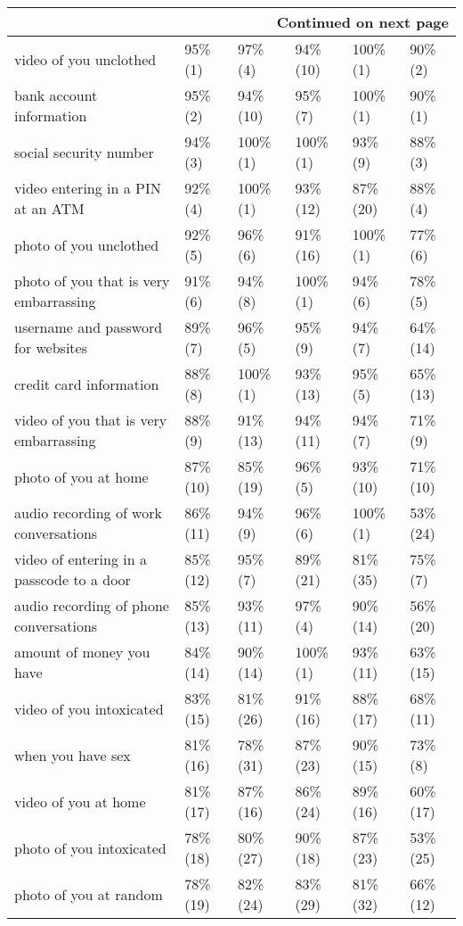 \documentclass[a4paper,12pt]{article}
\begin{document}
\begin{longtable}{| p{7cm} | l | l | l | l | l |}
\hline \multicolumn{6}{|r|}{{Continued on next page}} \\ \hline
\endfoot
\hline 
\endlastfoot
video of you unclothed & 95\% (1) & 97\% (4) & 94\% (10) & 100\% (1) & 90\% (2) \\ 
bank account information & 95\% (2) & 94\% (10) & 95\% (7) & 100\% (1) & 90\% (1) \\ 
social security number & 94\% (3) & 100\% (1) & 100\% (1) & 93\% (9) & 88\% (3) \\ 
video entering in a PIN at an ATM & 92\% (4) & 100\% (1) & 93\% (12) & 87\% (20) & 88\% (4) \\ 
photo of you unclothed & 92\% (5) & 96\% (6) & 91\% (16) & 100\% (1) & 77\% (6) \\ 
photo of you that is very embarrassing & 91\% (6) & 94\% (8) & 100\% (1) & 94\% (6) & 78\% (5) \\ 
username and password for websites & 89\% (7) & 96\% (5) & 95\% (9) & 94\% (7) & 64\% (14) \\ 
credit card information & 88\% (8) & 100\% (1) & 93\% (13) & 95\% (5) & 65\% (13) \\ 
video of you that is very embarrassing & 88\% (9) & 91\% (13) & 94\% (11) & 94\% (7) & 71\% (9) \\ 
photo of you at home & 87\% (10) & 85\% (19) & 96\% (5) & 93\% (10) & 71\% (10) \\ 
audio recording of work conversations & 86\% (11) & 94\% (9) & 96\% (6) & 100\% (1) & 53\% (24) \\ 
video of entering in a passcode to a door & 85\% (12) & 95\% (7) & 89\% (21) & 81\% (35) & 75\% (7) \\ 
audio recording of phone conversations & 85\% (13) & 93\% (11) & 97\% (4) & 90\% (14) & 56\% (20) \\ 
amount of money you have & 84\% (14) & 90\% (14) & 100\% (1) & 93\% (11) & 63\% (15) \\ 
video of you intoxicated & 83\% (15) & 81\% (26) & 91\% (16) & 88\% (17) & 68\% (11) \\ 
when you have sex & 81\% (16) & 78\% (31) & 87\% (23) & 90\% (15) & 73\% (8) \\ 
video of you at home & 81\% (17) & 87\% (16) & 86\% (24) & 89\% (16) & 60\% (17) \\ 
photo of you intoxicated & 78\% (18) & 80\% (27) & 90\% (18) & 87\% (23) & 53\% (25) \\ 
photo of you at random  & 78\% (19) & 82\% (24) & 83\% (29) & 81\% (32) & 66\% (12) \\ 

\end{longtable}
\end{document}
